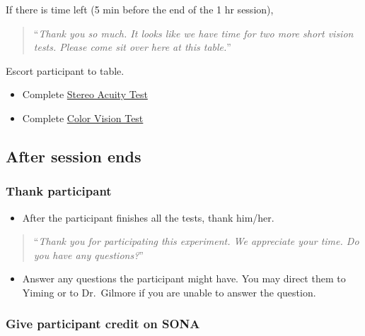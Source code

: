\documentclass[]{article}
\providecommand{\tightlist}{%
  \setlength{\itemsep}{0pt}\setlength{\parskip}{0pt}}
\begin{document}
If there is time left (5 min before the end of the 1 hr session),

\begin{quote}
``\emph{Thank you so much. It looks like we have time for two more short
vision tests. Please come sit over here at this table.}''
\end{quote}

Escort participant to table.

\begin{itemize}
\tightlist
\item
  Complete \href{vision-screening-protocol.html}{Stereo Acuity Test}
\item
  Complete \href{vision-screening-protocol.html}{Color Vision Test}
\end{itemize}

\hypertarget{after-session-ends}{%
\subsection{After session ends}\label{after-session-ends}}

\hypertarget{thank-participant}{%
\subsubsection{Thank participant}\label{thank-participant}}

\begin{itemize}
\tightlist
\item
  After the participant finishes all the tests, thank him/her.
\end{itemize}

\begin{quote}
``\emph{Thank you for participating this experiment. We appreciate your
time. Do you have any questions?}''
\end{quote}

\begin{itemize}
\tightlist
\item
  Answer any questions the participant might have. You may direct them
  to Yiming or to Dr.~Gilmore if you are unable to answer the question.
\end{itemize}

\hypertarget{give-participant-credit-on-sona}{%
\subsubsection{Give participant credit on
SONA}\label{give-participant-credit-on-sona}}
\end{document}
